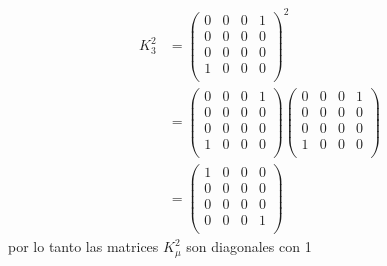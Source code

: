     \begin{align*}
        K_3^2 &=\left( \begin{matrix}
            0 & 0 & 0 & 1 \\
            0 & 0 & 0 & 0 \\
            0 & 0 & 0 & 0 \\
            1 & 0 & 0 & 0 \\
        \end{matrix}\right)^2 \\
        & =\left( \begin{matrix}
            0 & 0 & 0 & 1 \\
            0 & 0 & 0 & 0 \\
            0 & 0 & 0 & 0 \\
            1 & 0 & 0 & 0 \\
        \end{matrix}\right)\left( \begin{matrix}
            0 & 0 & 0 & 1 \\
            0 & 0 & 0 & 0 \\
            0 & 0 & 0 & 0 \\
            1 & 0 & 0 & 0 \\
        \end{matrix}\right)\\
        & =\left( \begin{matrix}
            1 & 0 & 0 & 0 \\
            0 & 0 & 0 & 0 \\
            0 & 0 & 0 & 0 \\
            0 & 0 & 0 & 1 \\
        \end{matrix}\right)
    \end{align*}
    por lo tanto las matrices $K_\mu^2$ son diagonales con 1
